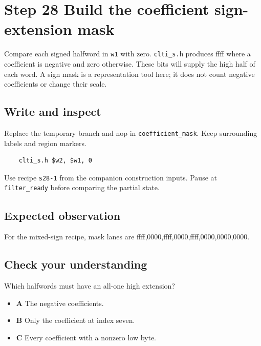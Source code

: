 \section{Step 28 Build the coefficient sign-extension mask}\label{fir-s28}

Compare each signed halfword in \texttt{w1} with zero. \texttt{clti\_s.h} produces ffff where a coefficient is negative and zero otherwise. These bits will supply the high half of each word. A sign mask is a representation tool here; it does not count negative coefficients or change their scale.

\subsection{Write and inspect}
Replace the temporary branch and nop in \texttt{coefficient\_mask}. Keep surrounding labels and region markers.

\begin{verbatim}
    clti_s.h $w2, $w1, 0
\end{verbatim}
Use recipe \texttt{s28-1} from the companion construction inputs. Pause at \texttt{filter\_ready} before comparing the partial state.

\subsection{Expected observation}
For the mixed-sign recipe, mask lanes are ffff,0000,ffff,0000,ffff,0000,0000,0000.

\subsection{Check your understanding}
Which halfwords must have an all-one high extension?

\begin{itemize}
  \item \textbf{A} The negative coefficients.
  \item \textbf{B} Only the coefficient at index seven.
  \item \textbf{C} Every coefficient with a nonzero low byte.
\end{itemize}
